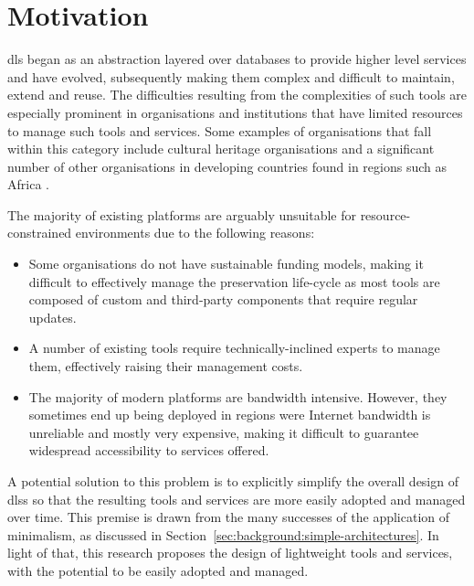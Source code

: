\section{Motivation}
\label{sec:introduction:motivation}


\glspl{dl} began as an abstraction layered over databases to provide higher level services \citep{Arms1997,Baldonado1997,Frew1998} and have evolved, subsequently making them complex \citep{Janee2002,Lagoze2006} and difficult to maintain, extend and reuse. The difficulties resulting from the complexities of such tools are especially prominent in organisations and institutions that have limited resources to manage such tools and services. Some examples of organisations that fall within this category include cultural heritage organisations and a significant number of other organisations in developing countries found in regions such as Africa \citep{Suleman2008}.

The majority of existing platforms are arguably unsuitable for resource-constrained environments due to the following reasons:

\begin{itemize}
 \item Some organisations do not have sustainable funding models, making it difficult to effectively manage the preservation life-cycle as most tools are composed of custom and third-party components that require regular updates.
 \item A number of existing tools require technically-inclined experts to manage them, effectively raising their management costs.
 \item The majority of modern platforms are bandwidth intensive. However, they sometimes end up being deployed in regions were Internet bandwidth is unreliable and mostly very expensive, making it difficult to guarantee widespread accessibility to services offered.
\end{itemize}

A potential solution to this problem is to explicitly simplify the overall design of \glspl{dls} so that the resulting tools and services are more easily adopted and managed over time. This premise is drawn from the many successes of the application of minimalism, as discussed in Section~\ref{sec:background:simple-architectures}. In light of that, this research proposes the design of lightweight tools and services, with the potential to be easily adopted and managed.